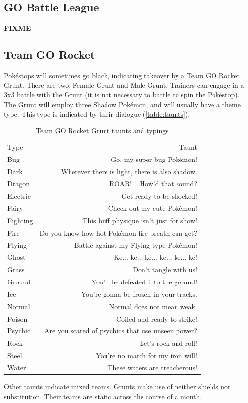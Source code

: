 \subsection{GO Battle League}
\label{subsec:league}
\textbf{FIXME}

\subsection{Team GO Rocket}
\label{subsec:rocket}
Pokéstops will sometimes go black, indicating takeover by a Team GO Rocket Grunt.
There are two: Female Grunt and Male Grunt.
Trainers can engage in a 3x3 battle with the Grunt (it is not necessary to battle to
  spin the Pokéstop).
The Grunt will employ three Shadow Pokémon, and will usually have a theme type.
This type is indicated by their dialogue (\autoref{table:taunts}).
\begin{table}
\centering
\begin{tabular}{lr}
Type & Taunt\\
\Midrule
  Bug & Go, my super bug Pokémon!\\
  Dark & Wherever there is light, there is also shadow.\\
  Dragon & ROAR! ...How'd that sound?\\
  Electric & Get ready to be shocked!\\
  Fairy & Check out my cute Pokémon!\\
  Fighting & This buff physique isn't just for show!\\
  Fire & Do you know how hot Pokémon fire breath can get?\\
  Flying & Battle against my Flying-type Pokémon!\\
  Ghost & Ke... ke... ke... ke... ke... ke!\\
  Grass & Don't tangle with us!\\
  Ground & You'll be defeated into the ground!\\
  Ice & You're gonna be frozen in your tracks.\\
  Normal & Normal does not mean weak.\\
  Poison & Coiled and ready to strike!\\
  Psychic & Are you scared of psychics that use unseen power?\\
  Rock & Let's rock and roll!\\
  Steel & You're no match for my iron will!\\
  Water & These waters are treacherous!\\
\end{tabular}
\caption{Team GO Rocket Grunt taunts and typings}
\label{table:taunts}
\end{table}
Other taunts indicate mixed teams.
Grunts make use of neither shields nor substitution.
Their teams are static across the course of a month.

